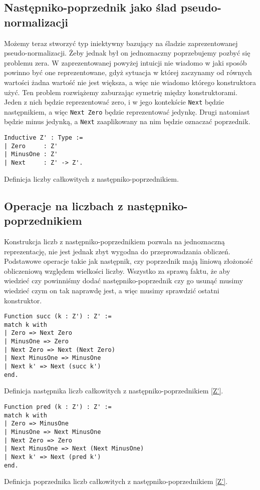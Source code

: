 \subsection{Następniko-poprzednik jako ślad pseudo-normalizacji}
Możemy teraz stworzyć typ iniektywny bazujący na śladzie zaprezentowanej pseudo-normalizacji. Żeby jednak był on jednoznaczny poprzebujemy pozbyć się problemu zera. W zaprezentowanej powyżej intuicji nie wiadomo w jaki sposób powinno być one reprezentowane, gdyż sytuacja w której zaczynamy od równych wartości żadna wartość nie jest większa, a więc nie wiadomo którego konstruktora użyć. Ten problem rozwiążemy zaburzając symetrię między konstruktorami. Jeden z nich będzie reprezentować zero, i w jego kontekście \texttt{Next} będzie następnikiem, a więc \texttt{Next Zero} będzie reprezentować jedynkę. Drugi natomiast będzie minus jedynką, a \texttt{Next} zaaplikowany na nim będzie oznaczać poprzednik.

\begin{code}
\begin{verbatim}
Inductive Z' : Type :=
| Zero     : Z'
| MinusOne : Z'
| Next     : Z' -> Z'.
\end{verbatim}
\caption{Definicja liczby całkowitych z następniko-poprzednikiem.}
\label{Z'}
\end{code}
\subsection{Operacje na liczbach z następniko-poprzednikiem}
Konstrukcja liczb z następniko-poprzednikiem pozwala na jednoznaczną reprezentację, nie jest jednak zbyt wygodna do przeprowadzania obliczeń. Podstawowe operacje takie jak następnik, czy poprzednik mają liniową złożoność obliczeniową względem wielkości liczby. Wszystko za sprawą faktu, że aby wiedzieć czy powinniśmy dodać następniko-poprzednik czy go usunąć musimy wiedzieć czym on tak naprawdę jest, a więc musimy sprawdzić ostatni konstruktor.
\begin{code}
\begin{verbatim}
Function succ (k : Z') : Z' :=
match k with
| Zero => Next Zero
| MinusOne => Zero
| Next Zero => Next (Next Zero)
| Next MinusOne => MinusOne
| Next k' => Next (succ k')
end.
\end{verbatim}
\caption{Definicja następnika liczb całkowitych z następniko-poprzednikiem \ref{Z'}.}
\label{Z'_succ}
\end{code}
\begin{code}
\begin{verbatim}
Function pred (k : Z') : Z' :=
match k with
| Zero => MinusOne
| MinusOne => Next MinusOne
| Next Zero => Zero
| Next MinusOne => Next (Next MinusOne)
| Next k' => Next (pred k')
end.
\end{verbatim}
\caption{Definicja poprzednika liczb całkowitych z następniko-poprzednikiem \ref{Z'}.}
\label{Z'_pred}
\end{code}

